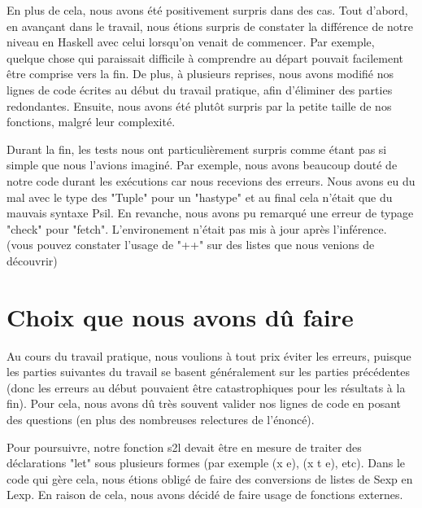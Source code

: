 \documentclass[11pt]{article}
\begin{document}
\par En plus de cela, nous avons été positivement surpris dans des cas. Tout d'abord, en avançant dans le travail, nous étions surpris de constater la différence de notre niveau en Haskell avec celui lorsqu'on venait de commencer. Par exemple, quelque chose qui paraissait difficile à comprendre au départ pouvait facilement être comprise vers la fin. De plus, à plusieurs reprises, nous avons modifié nos lignes de code écrites au début du travail pratique, afin d'éliminer des parties redondantes. Ensuite, nous avons été plutôt surpris par la petite taille de nos fonctions, malgré leur complexité.

\par Durant la fin, les tests nous ont particulièrement surpris comme étant pas si simple que nous l'avions imaginé. Par exemple, nous avons beaucoup douté de notre code durant les exécutions car nous recevions des erreurs. Nous avons eu du mal avec le type des "Tuple" pour un "hastype" et au final cela n'était que du mauvais syntaxe Psil. En revanche, nous avons pu remarqué une erreur de typage "check" pour "fetch". L'environement n'était pas mis à jour après l'inférence. (vous pouvez constater l'usage de "++" sur des listes que nous venions de découvrir) 

\section{Choix que nous avons dû faire}

\par Au cours du travail pratique, nous voulions à tout prix éviter les erreurs, puisque les parties suivantes du travail se basent généralement sur les parties précédentes (donc les erreurs au début pouvaient être catastrophiques pour les résultats à la fin). Pour cela, nous avons dû très souvent valider nos lignes de code en posant des questions (en plus des nombreuses relectures de l'énoncé). 

\par Pour poursuivre, notre fonction s2l devait être en mesure de traiter des déclarations "let" sous plusieurs formes (par exemple (x e), (x t e), etc). Dans le code qui gère cela, nous étions obligé de faire des conversions de listes de Sexp en Lexp. En raison de cela, nous avons décidé de faire usage de fonctions externes.
\end{document}
